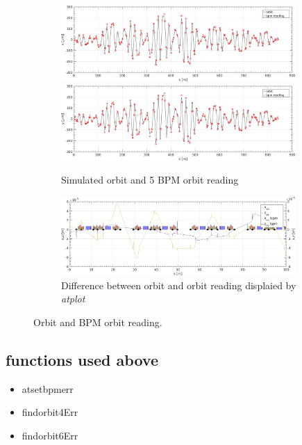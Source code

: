 \begin{figure}[!h]
	\centering
	\begin{subfigure}[b]{\textwidth}
  \includegraphics[width=0.98\textwidth]{./images/BPM/OrbitBPMAllErrX.jpg}
	\includegraphics[width=0.98\textwidth]{./images/BPM/OrbitBPMAllErrY.jpg}
	\caption{Simulated orbit and 5 BPM orbit reading}
        \label{fig:diptiltref}
    \end{subfigure}
	\begin{subfigure}[b]{\textwidth}
   	\includegraphics[width=0.98\textwidth]{./images/BPM/OrbitBPMAllErratplot.jpg}
	\caption{Difference between orbit and orbit reading displaied by \emph{atplot}}
        \label{fig:diptiltref}
    \end{subfigure}
	\caption{Orbit and BPM orbit reading.}
	\label{fig:bpmerr}
\end{figure}

\subsection*{functions used above}

\begin{itemize}
	\item atsetbpmerr
	\item findorbit4Err
	\item findorbit6Err
\end{itemize}

